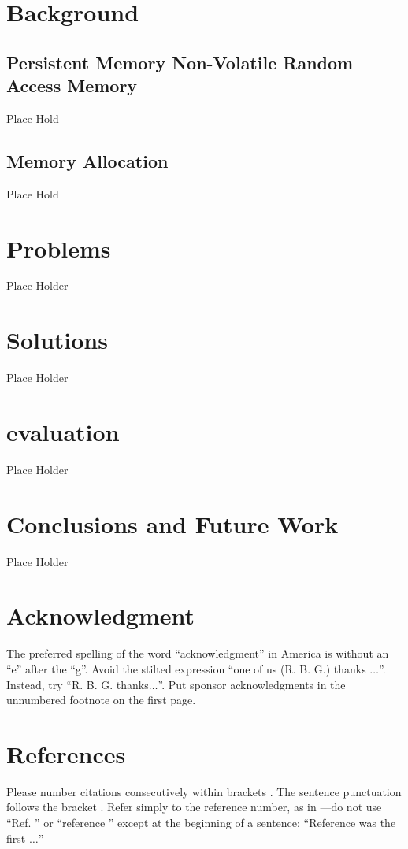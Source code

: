 \documentclass[conference]{IEEEtran}
\begin{document}
\section{Background}

\subsection{Persistent Memory Non-Volatile Random Access Memory}
Place Hold

\subsection{Memory Allocation}
Place Hold





\section{Problems}
Place Holder

\section{Solutions}
Place Holder

\section{evaluation}
Place Holder

\section{Conclusions and Future Work}
Place Holder

\section*{Acknowledgment}

The preferred spelling of the word ``acknowledgment'' in America is without 
an ``e'' after the ``g''. Avoid the stilted expression ``one of us (R. B. 
G.) thanks $\ldots$''. Instead, try ``R. B. G. thanks$\ldots$''. Put sponsor 
acknowledgments in the unnumbered footnote on the first page.

\section*{References}

Please number citations consecutively within brackets \cite{IEEEhowto:IEEEtranpage}. The 
sentence punctuation follows the bracket \cite{b2}. Refer simply to the reference 
number, as in \cite{b3}---do not use ``Ref. \cite{b3}'' or ``reference \cite{b3}'' except at 
the beginning of a sentence: ``Reference \cite{b3} was the first $\ldots$''
\end{document}
